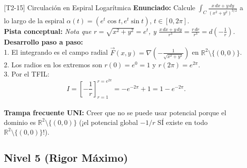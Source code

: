 \documentclass[11pt,a4paper]{article}
\begin{document}
\begin{ejerciciobox}{[T2-15] Circulación en Espiral Logarítmica}
\textbf{Enunciado:} Calcule $\int_C \frac{x\,dx + y\,dy}{(x^2+y^2)^{3/2}}$ a lo largo de la espiral $\alpha(t) = (e^t\cos t, e^t\sin t)$, $t \in [0, 2\pi]$.\\[0.2cm]
\textbf{Pista conceptual:} \emph{Nota que $r = \sqrt{x^2+y^2} = e^t$, y $\frac{x\,dx + y\,dy}{r^3} = \frac{r\,dr}{r^3} = d\left(-\frac{1}{r}\right)$.}\\[0.2cm]
\textbf{Desarrollo paso a paso:}\\
1. El integrando es el campo radial $\vec{F}(x,y) = \nabla\left(-\frac{1}{\sqrt{x^2+y^2}}\right)$ en $\mathbb{R}^2 \setminus \{(0,0)\}$.\\
2. Los radios en los extremos son $r(0) = e^0 = 1$ y $r(2\pi) = e^{2\pi}$.\\
3. Por el TFIL:\\
$$I = \left[-\frac{1}{r}\right]_{r=1}^{r=e^{2\pi}} = -e^{-2\pi} + 1 = 1 - e^{-2\pi}.$$\\[0.2cm]
\textbf{Trampa frecuente UNI:} Creer que no se puede usar potencial porque el dominio es $\mathbb{R}^2 \setminus \{(0,0)\}$ (¡el potencial global $-1/r$ SÍ existe en todo $\mathbb{R}^2 \setminus \{(0,0)\}$!).
\end{ejerciciobox}

\subsection{Nivel 5 (Rigor Máximo)}
\end{document}
